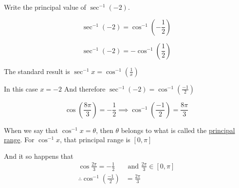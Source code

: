 \documentclass[14pt,fleqn]{extarticle}
\begin{document}
Write the principal value of $\sec^{-1}(-2)$. 
%
%
\newcard 

\[ \sec^{-1} (-2) = \cos^{-1} \left(-\frac{1}{2} \right)\]

\newcard 

\[ \sec^{-1} (-2) = -\cos^{-1} \left(\frac{1}{2} \right)\]

\newcard 

The standard result is $\sec^{-1} x = \cos^{-1} \left(\frac{1}{x} \right)$ \newline 

In this case $x = -2$\newline 
And therefore $\sec^{-1} (-2) = \cos^{-1} \left(\frac{-1}{2} \right)$ \newline 

\newcard 
\[ \cos \left(\frac{8\pi}{3} \right) = -\frac{1}{2} \implies\cos^{-1} \left( \frac{-1}{2}\right) = \frac{8\pi}{3}\]

\newcard 

When we say that $\cos^{-1}x = \theta$, then $\theta$ belongs to what is called the \underline{principal range}. For $\cos^{-1}x$, that principal range is $[0,\pi]$\newline 

And it so happens that 
\begin{align}
\cos \frac{2\pi}{3} = -\frac{1}{2} &\text{ and } \frac{2\pi}{3}\in [0,\pi] \\
\therefore \cos^{-1} \left(\frac{-1}{2} \right) &= \frac{2\pi}{3}
\end{align}
\end{document}
